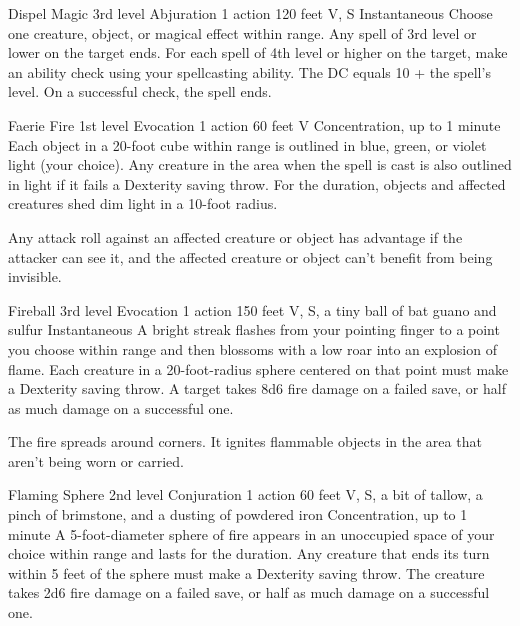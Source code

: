 \documentclass[10pt,a4paper,twoside,bg=print,twocolumn,openany,nodeprecatedcode]{dndbook}
\begin{document}


\DndSpellHeader%
{Dispel Magic}
{3rd level Abjuration}
{1 action}
{120 feet}
{V, S}
{Instantaneous}
Choose one creature, object, or magical effect within range. Any spell of 3rd level or lower on the target ends. For each spell of 4th level or higher on the target, make an ability check using your spellcasting ability. The DC equals 10 + the spell's level. On a successful check, the spell ends.



\DndSpellHeader%
{Faerie Fire}
{1st level Evocation}
{1 action}
{60 feet}
{V}
{Concentration, up to 1 minute}
Each object in a 20-foot cube within range is outlined in blue, green, or violet light (your choice). Any creature in the area when the spell is cast is also outlined in light if it fails a Dexterity saving throw. For the duration, objects and affected creatures shed dim light in a 10-foot radius.

Any attack roll against an affected creature or object has advantage if the attacker can see it, and the affected creature or object can't benefit from being invisible.



\DndSpellHeader%
{Fireball}
{3rd level Evocation}
{1 action}
{150 feet}
{V, S, a tiny ball of bat guano and sulfur}
{Instantaneous}
A bright streak flashes from your pointing finger to a point you choose within range and then blossoms with a low roar into an explosion of flame. Each creature in a 20-foot-radius sphere centered on that point must make a Dexterity saving throw. A target takes 8d6 fire damage on a failed save, or half as much damage on a successful one.

The fire spreads around corners. It ignites flammable objects in the area that aren't being worn or carried.



\DndSpellHeader%
{Flaming Sphere}
{2nd level Conjuration}
{1 action}
{60 feet}
{V, S, a bit of tallow, a pinch of brimstone, and a dusting of powdered iron}
{Concentration, up to 1 minute}
A 5-foot-diameter sphere of fire appears in an unoccupied space of your choice within range and lasts for the duration. Any creature that ends its turn within 5 feet of the sphere must make a Dexterity saving throw. The creature takes 2d6 fire damage on a failed save, or half as much damage on a successful one.
\end{document}

